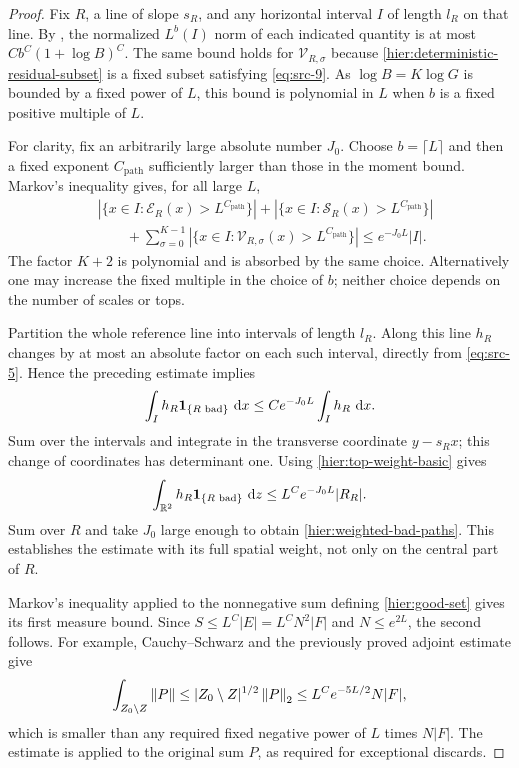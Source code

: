 \begin{proof}
Fix $R$, a line of slope $s_R$, and any horizontal interval $I$ of length
$l_R$ on that line.  By , the normalized
$L^b(I)$ norm of each indicated quantity is at most
$C b^C(1+\log B)^C$.  The same bound holds for
$\mathcal V_{R,\sigma}$ because
\eqref{hier:deterministic-residual-subset} is a fixed subset satisfying
\eqref{eq:src-9}.  As $\log B=K\log G$ is bounded by a fixed power of
$L$, this bound is polynomial in $L$ when $b$ is a fixed positive
multiple of $L$.

For clarity, fix an arbitrarily large absolute number $J_0$.  Choose
$b=\lceil L\rceil$ and then a fixed exponent
$C_{\mathrm{path}}$ sufficiently larger than those in the moment bound.
Markov's inequality gives, for all large $L$,
\[
 \begin{aligned}
 &|\{x\in I:\mathcal E_R(x)>L^{C_{\mathrm{path}}}\}|
  +|\{x\in I:\mathcal S_R(x)>L^{C_{\mathrm{path}}}\}|\\
 &\qquad
  +\sum_{\sigma=0}^{K-1}
   |\{x\in I:\mathcal V_{R,\sigma}(x)>L^{C_{\mathrm{path}}}\}|
  \le e^{-J_0L}|I|.
 \end{aligned}
\]
The factor $K+2$ is polynomial and is absorbed by the same choice.
Alternatively one may increase the fixed multiple in the choice of
$b$; neither choice depends on the number of scales or tops.

Partition the whole reference line into intervals of length $l_R$.
Along this line $h_R$ changes by at most an absolute factor on each such
interval, directly from \eqref{eq:src-5}.  Hence the preceding estimate
implies
\[
 \int_I h_R\mathbf 1_{\{R\text{ bad}\}}\,\,\mathrm d x
 \le C e^{-J_0L}\int_I h_R\,\,\mathrm d x.
\]
Sum over the intervals and integrate in the transverse coordinate
$y-s_Rx$; this change of coordinates has determinant one.  Using
\eqref{hier:top-weight-basic} gives
\[
 \int_{\mathbb R^2}h_R\mathbf 1_{\{R\text{ bad}\}}\,\,\mathrm d z
 \le L^C e^{-J_0L}|R_R|.
\]
Sum over $R$ and take $J_0$ large enough to obtain
\eqref{hier:weighted-bad-paths}.  This establishes the estimate with
its full spatial weight, not only on the central part of $R$.

Markov's inequality applied to the nonnegative sum defining
\eqref{hier:good-set} gives its first measure bound.  Since
$S\le L^C|E|=L^CN^2|F|$ and $N\le e^{2L}$, the second follows.
For example, Cauchy--Schwarz and the previously proved adjoint estimate
give
\[
 \int_{Z_0\setminus Z}\left\|P\right\|
 \le |Z_0\setminus Z|^{1/2}\left\|P\right\|_2
 \le L^Ce^{-5L/2}N|F|,
\]
which is smaller than any required fixed negative power of $L$ times
$N|F|$.  The estimate is applied to the original sum $P$, as required
for exceptional discards.


\end{proof}
